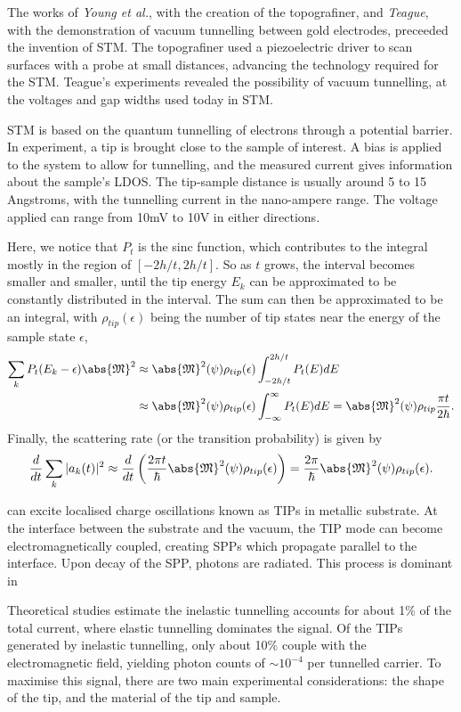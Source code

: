 The works \citep{tersoff19931} of \textit{Young et al.}, with the creation of the topografiner, and \textit{Teague}, with the demonstration of vacuum tunnelling between gold electrodes, preceeded the invention of \ac{STM}. The topografiner used a piezoelectric driver to scan surfaces with a probe at small distances, advancing the technology required for the \ac{STM}. Teague's experiments revealed the possibility of vacuum tunnelling, at the voltages and gap widths used today in \ac{STM}. 

\ac{STM} is based on the quantum tunnelling of electrons through a potential barrier. In experiment, a tip is brought close to the sample of interest. A bias is applied to the system to allow for tunnelling, and the measured current gives information about the sample's \ac{LDOS}. The tip-sample distance is usually around 5 to 15 Angstroms, with the tunnelling current in the nano-ampere range. The voltage applied can range from 10mV to 10V in either directions.


Here, we notice that $P_t$ is the sinc function, which contributes to the integral mostly in the region of $[-2h/t, 2h/t]$. So as $t$ grows, the interval becomes smaller and smaller, until the tip energy $E_k$ can be approximated to be constantly distributed in the interval. The sum can then be approximated to be an integral, with $\rho_{tip}(\epsilon)$ being the number of tip states near the energy of the sample state $\epsilon$, 
\begin{align}
\sum_k P_t(E_k - \epsilon) \abs{\mathfrak{M}}^2 &\approx \abs{\mathfrak{M}}^2(\psi) \rho_{tip}(\epsilon) \int_{-2h/t}^{2h/t} P_t(E) dE \\
& \approx \abs{\mathfrak{M}}^2(\psi) \rho_{tip}(\epsilon) \int_{-\infty}^{\infty} P_t(E) dE = \abs{\mathfrak{M}}^2(\psi) \rho_{tip} \frac{\pi t}{2\hbar}.
\end{align}
Finally, the scattering rate (or the transition probability) is given by
\begin{equation}
\frac{d}{dt} \sum_k |a_k(t)|^2 \approx \frac{d}{dt}\left( \frac{2\pi t}{\hbar} \abs{\mathfrak{M}}^2(\psi) \rho_{tip}(\epsilon) \right) = \frac{2 \pi}{\hbar} \abs{\mathfrak{M}}^2(\psi) \rho_{tip}(\epsilon).
\end{equation}

can excite localised charge oscillations known as \acp{TIP} in metallic substrate. At the interface between the substrate and the vacuum, the \ac{TIP} mode can become electromagnetically coupled, creating \acp{SPP} which propagate parallel to the interface. Upon decay of the \ac{SPP}, photons are radiated. This process is dominant in 

Theoretical studies estimate the inelastic tunnelling accounts for about 1\% of the total current,  where elastic tunnelling dominates the signal. Of the \acp{TIP} generated by inelastic tunnelling, only about 10\% couple with the electromagnetic field, yielding photon counts of $\sim 10^{-4}$ per tunnelled carrier. To maximise this signal, there are two main experimental considerations: the shape of the tip, and the material of the tip and sample.
